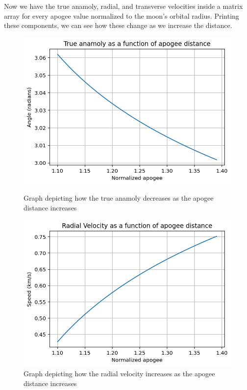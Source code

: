 \documentclass[12pt,twocolumn]{article}  %
\begin{document}
\noindent Now we have the true anamoly, radial, and transverse velocities inside a matrix array for every 
apogee value normalized to the moon's orbital radius. Printing these components, we can see how 
these change as we increase the distance. 
\begin{figure}[H]
    \centering
    \begin{minipage}{0.48\textwidth}
        \centering
        \includegraphics[width=\textwidth]{Images/221-theta.png}
        \caption{Graph depicting how the true anamoly decreases as the apogee distance increases}

    \end{minipage}
    \hfill
    \begin{minipage}{0.48\textwidth}
        \centering
        \includegraphics[width=\textwidth]{Images/221-rad.png}
        \caption{Graph depicting how the radial velocity increases as the apogee distance increases}


\end{minipage}
\end{figure}
\end{document}
